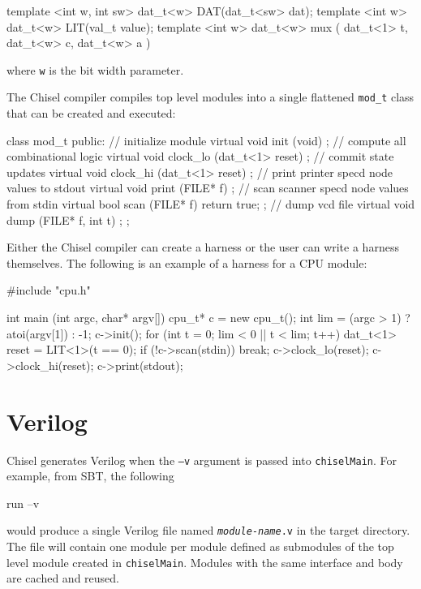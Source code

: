 \documentclass[10pt,twocolumn]{article}
\def\code#1{{\small\tt #1}}
\begin{document}
\begin{cpp}
template <int w, int sw> 
  dat_t<w> DAT(dat_t<sw> dat);
template <int w> 
  dat_t<w> LIT(val_t value);
template <int w> dat_t<w> 
  mux ( dat_t<1> t, dat_t<w> c, dat_t<w> a )
\end{cpp}

\noindent
where \code{w} is the bit width parameter.

The Chisel compiler compiles top level modules into a single flattened \code{mod\_t}
class that can be created and executed:

\begin{cpp}
class mod_t {
 public:
  // initialize module
  virtual void init (void) { };
  // compute all combinational logic
  virtual void clock_lo (dat_t<1> reset) { };
  // commit state updates
  virtual void clock_hi (dat_t<1> reset) { };
  // print printer specd node values to stdout
  virtual void print (FILE* f) { };
  // scan scanner specd node values from stdin
  virtual bool scan (FILE* f) { return true; };
  // dump vcd file
  virtual void dump (FILE* f, int t) { };
};
\end{cpp}

Either the Chisel compiler can create a harness or the user can write
a harness themselves.  The following is an example of a harness for a
CPU module:

\begin{cpp}
#include "cpu.h"

int main (int argc, char* argv[]) {
  cpu_t* c = new cpu_t();
  int lim = (argc > 1) ? atoi(argv[1]) : -1;
  c->init();
  for (int t = 0; lim < 0 || t < lim; t++) {
    dat_t<1> reset = LIT<1>(t == 0);
    if (!c->scan(stdin)) break;
    c->clock_lo(reset);
    c->clock_hi(reset);
    c->print(stdout);
  }
}
\end{cpp}

\section{Verilog}

Chisel generates Verilog when the \code{--v} argument is passed into
\code{chiselMain}.  For example, from SBT, the following

\begin{scala}
run --v
\end{scala}

\noindent
would produce a single Verilog file named \code{{\it module-name}.v} in
the target directory.
The file will contain one module per module defined as submodules of
the top level module created in \code{chiselMain}.  Modules with
the same interface and body are cached and reused.
\end{document}
